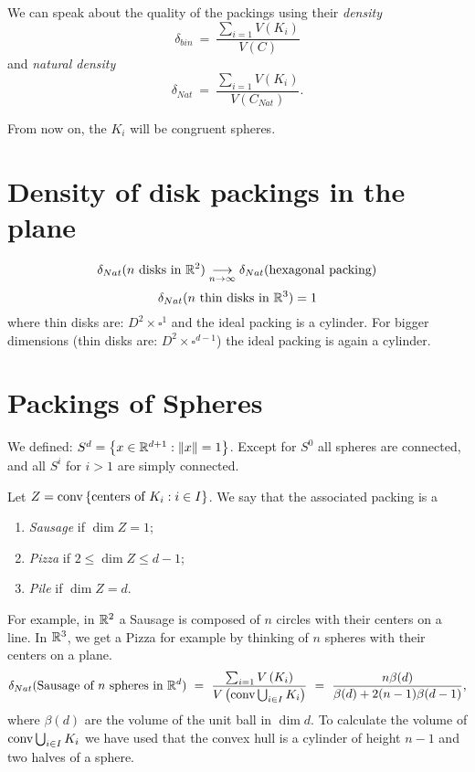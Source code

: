 \begin{defn}
 We can speak about the quality of the packings using their \emph{density}
 \[
   \delta_{bin}
   \ = \
   \frac{\sum_{i=1}V(K_i)}{V(C)}
\]
and \emph{natural density}
\[
   \delta_{Nat}
   \ = \
   \frac{\sum_{i=1}V(K_i)}{V(C_{Nat})}.
\]
\end{defn}

From now on, the $K_i$ will be congruent spheres.

\section{Density of disk packings in the plane}



\begin{lemma}[Thue in 1892]
 $$\delta_{Nat}(n \text{ disks in }\mathbb{R}^2)\underset{n\rightarrow\infty}{\longrightarrow}\delta_{Nat}(\text{hexagonal packing})$$
 $$\delta_{Nat}(n \text{ thin disks in }\mathbb{R}^3)=1$$
 where thin disks are: $D^2\times\square^1$ and the ideal packing is a cylinder. For bigger dimensions (thin disks are: $D^2\times\square^{d-1}$) the ideal packing is again a cylinder. 
\end{lemma}

\section{Packings of Spheres}

\begin{obs}
 We defined: $S^d=\left\{x\in\mathbb{R}^{d+1}:\|x\|=1\right\}$.
 Except for $S^0$ all spheres are connected, and all $S^i$ for $i>1$ are simply connected.
\end{obs}

\begin{defn}
 Let $Z=\operatorname{conv}\left\{\text{centers of }K_i: i\in I\right\}$. We say that the
 associated packing is a 
\begin{enumerate}
 \item \emph{Sausage} if $\dim Z=1$;
 \item \emph{Pizza} if $2\leqslant\dim Z\leqslant d-1$;
 \item \emph{Pile} if $\dim Z=d$.
\end{enumerate}
\end{defn}

For example, in $\mathbb{R}^2$ a Sausage is composed of $n$ circles with their centers on a
line. In $\mathbb{R}^3$, we get a Pizza for example by thinking of $n$ spheres with their centers
on a plane.
\[
  \delta_{Nat}(\text{Sausage of }n\text{ spheres in }\RR^d)
  \ = \ 
  \frac{\sum_{i=1}V\left(K_i\right)}{V\left(\conv\bigcup_{i\in I}K_i\right)}
  \ = \
  \frac{n\beta(d)}{\beta(d)+2(n-1)\beta(d-1)},
\]
where $\beta(d)$ are the volume of the unit ball in $\dim d$. To calculate the volume of
$\operatorname{conv}\bigcup_{i\in I}K_i$ we have used that the convex hull is a cylinder of
height $n-1$ and two halves of a sphere.

